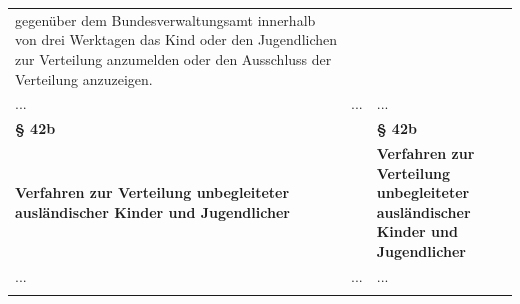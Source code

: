 \documentclass[10pt,a4paper,landscape]{article}
\begin{document}
\begin{longtable}{|L{8.2cm}|L{8.2cm}|L{8.2cm}|}
\newline gegenüber dem Bundesverwaltungsamt  \newline innerhalb von drei Werktagen das Kind  \newline oder den Jugendlichen zur Verteilung  \newline anzumelden oder den Ausschluss der  \newline Verteilung anzuzeigen. \\
\hhline{|---|}
... & ... & ... \\
\hhline{|---|}
\textbf{\S{} 42b} &  & \textbf{\S{} 42b} \\
\hhline{|---|}
\textbf{Verfahren zur Verteilung unbegleiteter  \newline ausländischer Kinder und Jugendlicher} &  & \textbf{Verfahren zur Verteilung unbegleiteter  \newline ausländischer Kinder und Jugendlicher} \\
\hhline{|---|}
... & ... & ... \\
\hhline{|---|}

\end{longtable}
\end{document}
